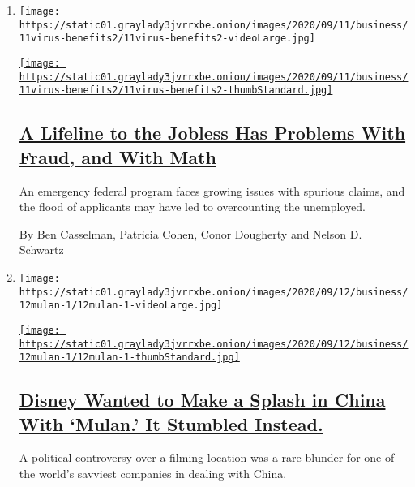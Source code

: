 \begin{enumerate}
\def\labelenumi{\arabic{enumi}.}
\item
  \texttt{[image: https://static01.graylady3jvrrxbe.onion/images/2020/09/11/business/11virus-benefits2/11virus-benefits2-videoLarge.jpg]}

  \href{/2020/09/11/business/economy/pandemic-unemployment-assistance-fraud.html}{\texttt{[image: https://static01.graylady3jvrrxbe.onion/images/2020/09/11/business/11virus-benefits2/11virus-benefits2-thumbStandard.jpg]}}

  \hypertarget{a-lifeline-to-the-jobless-has-problems-with-fraud-and-with-math}{%
  \subsection{\texorpdfstring{\href{/2020/09/11/business/economy/pandemic-unemployment-assistance-fraud.html}{A
  Lifeline to the Jobless Has Problems With Fraud, and With
  Math}}{A Lifeline to the Jobless Has Problems With Fraud, and With Math}}\label{a-lifeline-to-the-jobless-has-problems-with-fraud-and-with-math}}

  An emergency federal program faces growing issues with spurious
  claims, and the flood of applicants may have led to overcounting the
  unemployed.

  By Ben Casselman, Patricia Cohen, Conor Dougherty and Nelson D.
  Schwartz
\item
  \texttt{[image: https://static01.graylady3jvrrxbe.onion/images/2020/09/12/business/12mulan-1/12mulan-1-videoLarge.jpg]}

  \href{/2020/09/12/business/media/disney-mulan-china.html}{\texttt{[image: https://static01.graylady3jvrrxbe.onion/images/2020/09/12/business/12mulan-1/12mulan-1-thumbStandard.jpg]}}

  \hypertarget{disney-wanted-to-make-a-splash-in-china-with-mulan-it-stumbled-instead}{%
  \subsection{\texorpdfstring{\href{/2020/09/12/business/media/disney-mulan-china.html}{Disney
  Wanted to Make a Splash in China With `Mulan.' It Stumbled
  Instead.}}{Disney Wanted to Make a Splash in China With `Mulan.' It Stumbled Instead.}}\label{disney-wanted-to-make-a-splash-in-china-with-mulan-it-stumbled-instead}}

  A political controversy over a filming location was a rare blunder for
  one of the world's savviest companies in dealing with China.


\end{enumerate}
